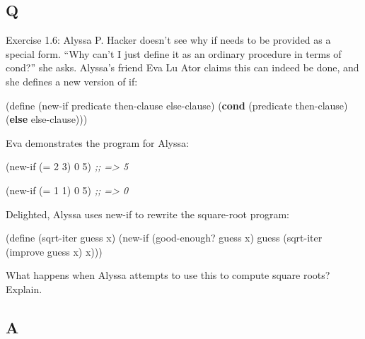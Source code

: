 \documentclass[
]{article}
\newenvironment{Shaded}{}{}
\newcommand{\CommentTok}[1]{\textcolor[rgb]{0.38,0.63,0.69}{\textit{#1}}}
\newcommand{\DecValTok}[1]{\textcolor[rgb]{0.25,0.63,0.44}{#1}}
\newcommand{\ExtensionTok}[1]{#1}
\newcommand{\FunctionTok}[1]{\textcolor[rgb]{0.02,0.16,0.49}{#1}}
\newcommand{\KeywordTok}[1]{\textcolor[rgb]{0.00,0.44,0.13}{\textbf{#1}}}
\newcommand{\NormalTok}[1]{#1}
\newcommand{\OperatorTok}[1]{\textcolor[rgb]{0.40,0.40,0.40}{#1}}
\begin{document}
\hypertarget{q-5}{%
\subsection{Q}\label{q-5}}

Exercise 1.6: Alyssa P. Hacker doesn't see why if needs to be provided
as a special form. ``Why can't I just define it as an ordinary procedure
in terms of cond?'' she asks. Alyssa's friend Eva Lu Ator claims this
can indeed be done, and she defines a new version of if:

\begin{Shaded}
\begin{Highlighting}[numbers=left,,]
\NormalTok{(}\ExtensionTok{define}\FunctionTok{ }\NormalTok{(new{-}if predicate}
\NormalTok{                then{-}clause}
\NormalTok{                else{-}clause)}
\NormalTok{  (}\KeywordTok{cond}\NormalTok{ (predicate then{-}clause)}
\NormalTok{        (}\KeywordTok{else}\NormalTok{ else{-}clause)))}
\end{Highlighting}
\end{Shaded}

Eva demonstrates the program for Alyssa:

\begin{Shaded}
\begin{Highlighting}[numbers=left,,]
\NormalTok{(new{-}if (}\OperatorTok{=} \DecValTok{2} \DecValTok{3}\NormalTok{) }\DecValTok{0} \DecValTok{5}\NormalTok{)}
\CommentTok{;; =\textgreater{} 5}

\NormalTok{(new{-}if (}\OperatorTok{=} \DecValTok{1} \DecValTok{1}\NormalTok{) }\DecValTok{0} \DecValTok{5}\NormalTok{)}
\CommentTok{;; =\textgreater{} 0}
\end{Highlighting}
\end{Shaded}

Delighted, Alyssa uses new-if to rewrite the square-root program:

\begin{Shaded}
\begin{Highlighting}[numbers=left,,]
\NormalTok{(}\ExtensionTok{define}\FunctionTok{ }\NormalTok{(sqrt{-}iter guess x)}
\NormalTok{  (new{-}if (good{-}enough? guess x)}
\NormalTok{          guess}
\NormalTok{          (sqrt{-}iter (improve guess x) x)))}
\end{Highlighting}
\end{Shaded}

What happens when Alyssa attempts to use this to compute square roots?
Explain.

\hypertarget{a-5}{%
\subsection{A}\label{a-5}}
\end{document}
